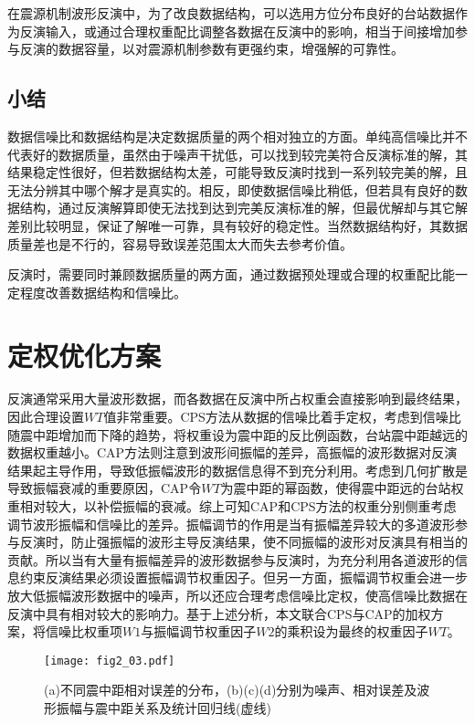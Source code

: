 在震源机制波形反演中，为了改良数据结构，可以选用方位分布良好的台站数据作为反演输入，或通过合理权重配比调整各数据在反演中的影响，相当于间接增加参与反演的数据容量，以对震源机制参数有更强约束，增强解的可靠性。

\subsection{小结}

数据信噪比和数据结构是决定数据质量的两个相对独立的方面。单纯高信噪比并不代表好的数据质量，虽然由于噪声干扰低，可以找到较完美符合反演标准的解，其结果稳定性很好，但若数据结构太差，可能导致反演时找到一系列较完美的解，且无法分辨其中哪个解才是真实的。相反，即使数据信噪比稍低，但若具有良好的数据结构，通过反演解算即使无法找到达到完美反演标准的解，但最优解却与其它解差别比较明显，保证了解唯一可靠，具有较好的稳定性。当然数据结构好，其数据质量差也是不行的，容易导致误差范围太大而失去参考价值。

反演时，需要同时兼顾数据质量的两方面，通过数据预处理或合理的权重配比能一定程度改善数据结构和信噪比。

\section{定权优化方案}

反演通常采用大量波形数据，而各数据在反演中所占权重会直接影响到最终结果，因此合理设置$WT$值非常重要。CPS方法从数据的信噪比着手定权，考虑到信噪比随震中距增加而下降的趋势，将权重设为震中距的反比例函数，台站震中距越远的数据权重越小。CAP方法\citep{Zhu1996}则注意到波形间振幅的差异，高振幅的波形数据对反演结果起主导作用，导致低振幅波形的数据信息得不到充分利用。考虑到几何扩散是导致振幅衰减的重要原因，CAP令$WT$为震中距的幂函数，使得震中距远的台站权重相对较大，以补偿振幅的衰减。综上可知CAP和CPS方法的权重分别侧重考虑调节波形振幅和信噪比的差异。振幅调节的作用是当有振幅差异较大的多道波形参与反演时，防止强振幅的波形主导反演结果，使不同振幅的波形对反演具有相当的贡献。所以当有大量有振幅差异的波形数据参与反演时，为充分利用各道波形的信息约束反演结果必须设置振幅调节权重因子。但另一方面，振幅调节权重会进一步放大低振幅波形数据中的噪声，所以还应合理考虑信噪比定权，使高信噪比数据在反演中具有相对较大的影响力。基于上述分析，本文联合CPS与CAP的加权方案，将信噪比权重项$W1$与振幅调节权重因子$W2$的乘积设为最终的权重因子$WT$。
\begin{figure}[h]
\centering
  \texttt{[image: fig2\_03.pdf]} 
  \caption{(a)不同震中距相对误差的分布，(b)(c)(d)分别为噪声、相对误差及波形振幅与震中距关系及统计回归线(虚线)}
  \label{fig2_03}
\end{figure}

